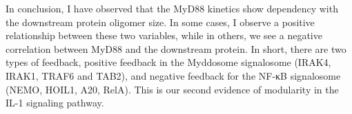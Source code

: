 In conclusion, I have observed that the MyD88 kinetics show dependency with the downstream protein oligomer size. In some cases, I observe a positive relationship between these two variables, while in others, we see a negative correlation between MyD88 and the downstream protein. In short, there are two types of feedback, positive feedback in the Myddosome signalosome (IRAK4, IRAK1, TRAF6 and TAB2), and negative feedback for the NF-κB signalosome (NEMO, HOIL1, A20, RelA). This is our second evidence of modularity in the IL-1 signaling pathway.


\begin{centering}

\end{centering}
